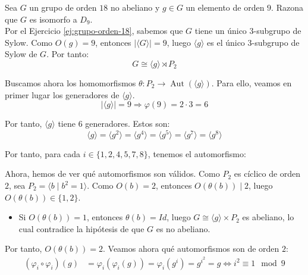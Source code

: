\documentclass[12pt]{article}
\DeclareMathOperator{\Aut}{Aut}
\begin{document}
    \begin{ejercicio}\label{ej:grupo-orden-18-isomorfo-D9}
        Sea $G$ un grupo de orden $18$ no abeliano y $g \in G$ un elemento de orden $9$. Razona que $G$ es isomorfo a $D_9$.\\

        Por el Ejercicio \ref{ej:grupo-orden-18}, sabemos que $G$ tiene un único $3$-subgrupo de Sylow. Como $O(g)=9$, entonces $|\langle G\rangle|=9$, luego $\langle g\rangle$ es el único $3$-subgrupo de Sylow de $G$. Por tanto:
        \begin{equation*}
            G\cong \langle g\rangle \rtimes P_2
        \end{equation*}

        Buscamos ahora los homomorfismos $\theta: P_2 \to \Aut(\langle g\rangle )$. Para ello, veamos en primer lugar los generadores de $\langle g\rangle $.
        \begin{equation*}
            |\langle g\rangle | = 9 \Longrightarrow \varphi(9)=2\cdot 3=6
        \end{equation*}

        Por tanto, $\langle g\rangle $ tiene $6$ generadores. Estos son:
        \begin{equation*}
            \langle g\rangle = \langle g^2\rangle = \langle g^4\rangle = \langle g^5\rangle = \langle g^7\rangle = \langle g^8\rangle
        \end{equation*}

        Por tanto, para cada $i\in \{1,2,4,5,7,8\}$, tenemos el automorfismo:

        Ahora, hemos de ver qué automorfismos son válidos. Como $P_2$ es cíclico de orden $2$, sea $P_2=\langle b\mid b^2=1\rangle$. Como $O(b)=2$, entonces $O(\theta(b))\mid 2$, luego $O(\theta(b))\in \{1,2\}$.
        \begin{itemize}
            \item Si $O(\theta(b))=1$, entonces $\theta(b)=Id$, luego $G\cong \langle g\rangle \times P_2$ es abeliano, lo cual contradice la hipótesis de que $G$ es no abeliano.
        \end{itemize}

        Por tanto, $O(\theta(b))=2$. Veamos ahora qué automorfismos son de orden $2$:
        \begin{align*}
            (\varphi_i \circ \varphi_i)(g) & = \varphi_i(\varphi_i(g)) = \varphi_i(g^i) = g^{i^2} = g\iff i^2 \equiv 1 \mod 9\\
        \end{align*}


\end{ejercicio}
\end{document}
